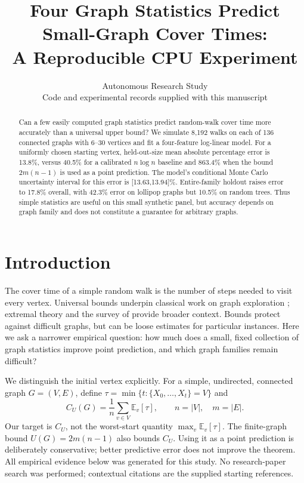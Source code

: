 \documentclass{article}
\title{Four Graph Statistics Predict Small-Graph Cover Times:\\A Reproducible CPU Experiment}
\author{Autonomous Research Study\\Code and experimental records supplied with this manuscript}
\begin{document}
\maketitle

\begin{abstract}
Can a few easily computed graph statistics predict random-walk cover time more accurately than a universal upper bound? We simulate 8,192 walks on each of 136 connected graphs with 6--30 vertices and fit a four-feature log-linear model. For a uniformly chosen starting vertex, held-out-size mean absolute percentage error is 13.8\%, versus 40.5\% for a calibrated $n\log n$ baseline and 863.4\% when the bound $2m(n-1)$ is used as a point prediction. The model's conditional Monte Carlo uncertainty interval for this error is [13.63,13.94]\%. Entire-family holdout raises error to 17.8\% overall, with 42.3\% error on lollipop graphs but 10.5\% on random trees. Thus simple statistics are useful on this small synthetic panel, but accuracy depends on graph family and does not constitute a guarantee for arbitrary graphs.
\end{abstract}

\section{Introduction}
The cover time of a simple random walk is the number of steps needed to visit every vertex. Universal bounds underpin classical work on graph exploration \citep{aleliunas1979}; extremal theory \citep{feige1995} and the survey of \citet{lovasz1993} provide broader context. Bounds protect against difficult graphs, but can be loose estimates for particular instances. Here we ask a narrower empirical question: how much does a small, fixed collection of graph statistics improve point prediction, and which graph families remain difficult?

We distinguish the initial vertex explicitly. For a simple, undirected, connected graph $G=(V,E)$, define $\tau=\min\{t:\{X_0,\ldots,X_t\}=V\}$ and
\[
 C_U(G)=\frac{1}{n}\sum_{v\in V}\mathbb{E}_v[\tau],\qquad n=|V|,\quad m=|E|.
\]
Our target is $C_U$, not the worst-start quantity $\max_v\mathbb{E}_v[\tau]$. The finite-graph bound $U(G)=2m(n-1)$ also bounds $C_U$. Using it as a point prediction is deliberately conservative; better predictive error does not improve the theorem. All empirical evidence below was generated for this study. No research-paper search was performed; contextual citations are the supplied starting references.
\end{document}
